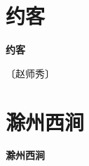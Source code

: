 \documentclass[12pt,UTF-8,openany,fontset=none]{ctexbook}
\begin{document}
\vspace{8pt}
\clearpage

\section{约客}



\begin{center}
    {\bfseries 约客}
\end{center}

\begin{center}
    \vspace{10pt}
    
    \begin{large}
        
        〔赵师秀〕
        
    \end{large}
    
    \vspace{8pt}
    
    \begin{huge}
        
        \phantom{。}

        \phantom{。}
        
        \phantom{。}

        \phantom{。}
        
    \end{huge}
    
\end{center}

\vspace{8pt}
\clearpage

\section{滁州西涧}



\begin{center}
    {\bfseries 滁州西涧}
\end{center}
\end{document}
